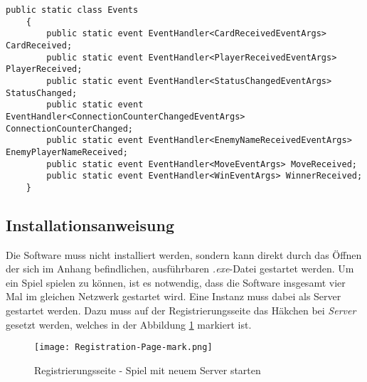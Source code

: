 \begin{lstlisting}[label=code:client-events, caption={Codeauschnitt Client Events}]
	public static class Events
	{
		public static event EventHandler<CardReceivedEventArgs> CardReceived;
		public static event EventHandler<PlayerReceivedEventArgs> PlayerReceived;
		public static event EventHandler<StatusChangedEventArgs> StatusChanged;
		public static event EventHandler<ConnectionCounterChangedEventArgs> ConnectionCounterChanged;
		public static event EventHandler<EnemyNameReceivedEventArgs> EnemyPlayerNameReceived;
		public static event EventHandler<MoveEventArgs> MoveReceived;
		public static event EventHandler<WinEventArgs> WinnerReceived;
	}	
\end{lstlisting}
\subsection{Installationsanweisung}
Die Software muss nicht installiert werden, sondern kann direkt durch das Öffnen der sich im Anhang befindlichen, ausführbaren \textit{.exe}-Datei gestartet werden. Um ein Spiel spielen zu können, ist es notwendig, dass die Software insgesamt vier Mal im gleichen Netzwerk gestartet wird. Eine Instanz muss dabei als Server gestartet werden. Dazu muss auf der Registrierungsseite das Häkchen bei \textit{Server} gesetzt werden, welches in der Abbildung \ref{fig:regipage-mark} markiert ist.
\begin{figure}[h]
	\begin{center}
		\texttt{[image: Registration-Page-mark.png]}
		\label{fig:regipage-mark}
		\caption{Registrierungsseite - Spiel mit neuem Server starten}
	\end{center}
\end{figure}